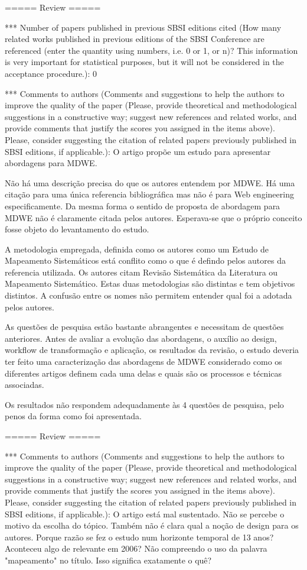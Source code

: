 ===== Review =====


*** Number of papers published in previous SBSI editions cited (How many
related works published in previous editions of the SBSI Conference are
referenced (enter the quantity using numbers, i.e. 0 or 1, or n)? This
information is very important for statistical purposes, but it will not
be considered in the acceptance procedure.): 0

*** Comments to authors (Comments and suggestions to help the authors to
improve the quality of the paper (Please, provide theoretical and
methodological suggestions in a constructive way; suggest new references
and related works, and provide comments that justify the scores you
assigned in the items above). Please, consider suggesting the citation
of related papers previously published in SBSI editions, if
applicable.): O artigo propõe um estudo para apresentar abordagens para
MDWE.

Não há uma descrição precisa do que os autores entendem por MDWE. Há uma
citação para uma única referencia bibliográfica mas não é para Web
engineering especificamente. Da mesma forma o sentido de proposta de
abordagem para MDWE não é claramente citada pelos autores. Esperava-se
que o próprio conceito fosse objeto do levantamento do estudo.

A metodologia empregada, definida como os autores como um Estudo de
Mapeamento Sistemáticos está conflito como o que é defindo pelos autores
da referencia utilizada. Os autores citam Revisão Sistemática da
Literatura ou Mapeamento Sistemático. Estas duas metodologias são
distintas e tem objetivos distintos. A confusão entre os nomes não
permitem entender qual foi a adotada pelos autores.

As questões de pesquisa estão bastante abrangentes e necessitam de
questões anteriores. Antes de avaliar a evolução das abordagens, o
auxílio ao design, workflow de transformação e aplicação, os resultados
da revisão, o estudo deveria ter feito uma caracterização das abordagens
de MDWE considerado como os diferentes artigos definem cada uma delas e
quais são os processos e técnicas associadas.

Os resultados não respondem adequadamente às 4 questões de pesquisa,
pelo penos da forma como foi apresentada.


===== Review =====


*** Comments to authors (Comments and suggestions to help the authors to
improve the quality of the paper (Please, provide theoretical and
methodological suggestions in a constructive way; suggest new references
and related works, and provide comments that justify the scores you
assigned in the items above). Please, consider suggesting the citation
of related papers previously published in SBSI editions, if
applicable.): O artigo está mal sustentado. Não se percebe o motivo da
escolha do tópico. Também não é clara qual a noção de design para os
autores. Porque razão se fez o estudo num horizonte temporal de 13 anos?
Aconteceu algo de relevante em 2006? Não compreendo o uso da palavra
"mapeamento" no título. Isso significa exatamente o quê?

